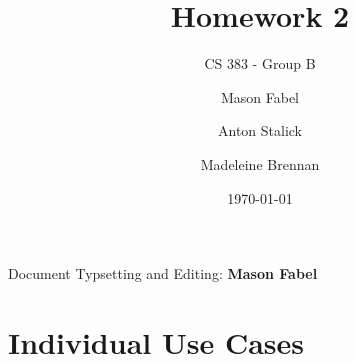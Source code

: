 \documentclass[12pt]{report}
\title{Homework 2}
\subtitle{CS 383 - Group B}
\author{
Mason Fabel \\
\and Anton Stalick \\
\and Madeleine Brennan \\
}
\date{\today}
\newlength\tindent
\renewcommand{\indent}{\hspace*{\tindent}}
\begin{document}
\maketitle

\tableofcontents
Document Typsetting and Editing: \textbf{Mason Fabel}
\clearpage

\chapter{Individual Use Cases}






\end{document}
